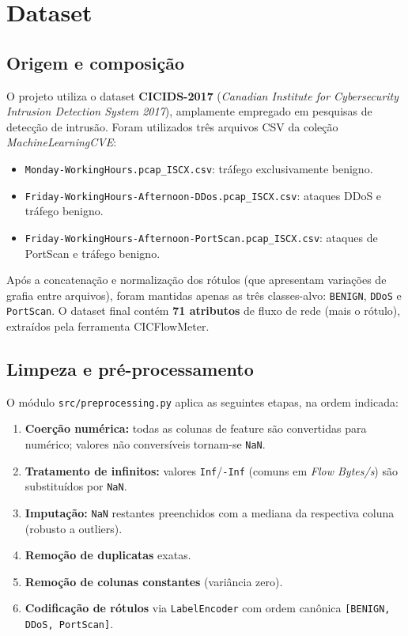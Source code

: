 \documentclass[12pt,a4paper]{article}
\begin{document}
\section{Dataset}

\subsection{Origem e composição}

O projeto utiliza o dataset \textbf{CICIDS-2017} (\emph{Canadian Institute
for Cybersecurity Intrusion Detection System 2017}), amplamente empregado
em pesquisas de detecção de intrusão. Foram utilizados três arquivos CSV
da coleção \emph{MachineLearningCVE}:

\begin{itemize}
  \item \texttt{Monday-WorkingHours.pcap\_ISCX.csv}: tráfego exclusivamente
        benigno.
  \item \texttt{Friday-WorkingHours-Afternoon-DDos.pcap\_ISCX.csv}: ataques
        DDoS e tráfego benigno.
  \item \texttt{Friday-WorkingHours-Afternoon-PortScan.pcap\_ISCX.csv}:
        ataques de PortScan e tráfego benigno.
\end{itemize}

Após a concatenação e normalização dos rótulos (que apresentam variações de
grafia entre arquivos), foram mantidas apenas as três classes-alvo:
\texttt{BENIGN}, \texttt{DDoS} e \texttt{PortScan}. O dataset final contém
\textbf{71 atributos} de fluxo de rede (mais o rótulo), extraídos pela
ferramenta CICFlowMeter.

\subsection{Limpeza e pré-processamento}

O módulo \texttt{src/preprocessing.py} aplica as seguintes etapas, na ordem
indicada:

\begin{enumerate}
  \item \textbf{Coerção numérica:} todas as colunas de feature são convertidas
        para numérico; valores não conversíveis tornam-se \texttt{NaN}.
  \item \textbf{Tratamento de infinitos:} valores \texttt{Inf}/\texttt{-Inf}
        (comuns em \emph{Flow Bytes/s}) são substituídos por \texttt{NaN}.
  \item \textbf{Imputação:} \texttt{NaN} restantes preenchidos com a mediana
        da respectiva coluna (robusto a outliers).
  \item \textbf{Remoção de duplicatas} exatas.
  \item \textbf{Remoção de colunas constantes} (variância zero).
  \item \textbf{Codificação de rótulos} via \texttt{LabelEncoder} com ordem
        canônica \texttt{[BENIGN, DDoS, PortScan]}.
\end{enumerate}
\end{document}
